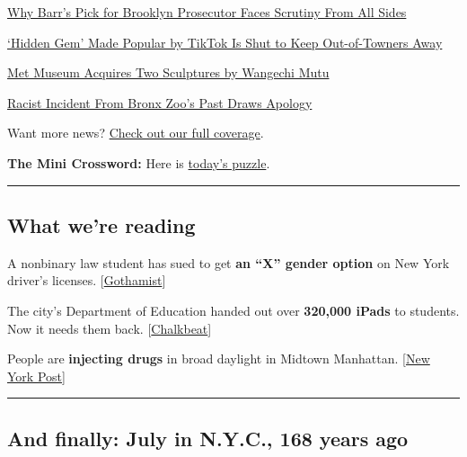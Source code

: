\href{https://www.nytimes.com/2020/07/30/nyregion/seth-ducharme-us-attorney-brooklyn.html}{Why
Barr's Pick for Brooklyn Prosecutor Faces Scrutiny From All Sides}

\href{https://www.nytimes.com/2020/07/29/nyregion/lake-solitude-closed-racism.html}{`Hidden
Gem' Made Popular by TikTok Is Shut to Keep Out-of-Towners Away}

\href{https://www.nytimes.com/2020/07/28/arts/design/met-museum-wangechi-mutu.html}{Met
Museum Acquires Two Sculptures by Wangechi Mutu}

\href{https://www.nytimes.com/2020/07/29/arts/bronx-zoo-apology-racism.html}{Racist
Incident From Bronx Zoo's Past Draws Apology}

Want more news? \href{https://www.nytimes.com/section/nyregion}{Check
out our full coverage}.

\textbf{The Mini Crossword:} Here is
\href{https://www.nytimes.com/crosswords/game/mini}{today's puzzle}.

\begin{center}\rule{0.5\linewidth}{\linethickness}\end{center}

\hypertarget{what-were-reading}{%
\subsection{What we're reading}\label{what-were-reading}}

A nonbinary law student has sued to get \textbf{an ``X'' gender option}
on New York driver's licenses.
{[}\href{https://gothamist.com/news/nonbinary-nyu-law-student-sues-get-x-gender-option-ny-drivers-licenses}{Gothamist}{]}

The city's Department of Education handed out over \textbf{320,000
iPads} to students. Now it needs them back.
{[}\href{https://ny.chalkbeat.org/2020/7/29/21347043/remote-learning-devices-distribution-nyc}{Chalkbeat}{]}

People are \textbf{injecting drugs} in broad daylight in Midtown
Manhattan.
{[}\href{https://nypost.com/2020/07/28/apparent-junkies-turn-part-of-nycs-midtown-into-shooting-gallery/}{New
York Post}{]}

\begin{center}\rule{0.5\linewidth}{\linethickness}\end{center}

\hypertarget{and-finally-july-in-nyc-168-years-ago}{%
\subsection{And finally: July in N.Y.C., 168 years
ago}\label{and-finally-july-in-nyc-168-years-ago}}

